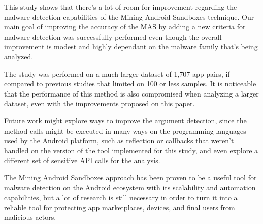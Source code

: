 This study shows that there's a lot of room for improvement regarding the malware detection capabilities of the Mining Android Sandboxes technique. Our main goal of improving the accuracy of the MAS by adding a new criteria for malware detection was successfully performed even though the overall improvement is modest and highly dependant on the malware family that's being analyzed.

The study was performed on a much larger dataset of 1,707 app pairs, if compared to previous studies that limited on 100 or less samples. It is noticeable that the performance of this method is also compromised when analyzing a larger dataset, even with the improvements proposed on this paper.

Future work might explore ways to improve the argument detection, since the method calls might be executed in many ways on the programming languages used by the Android platform, such as reflection or callbacks that weren't handled on the version of the tool implemented for this study, and even explore a different set of sensitive API calls for the analysis.

The Mining Android Sandboxes approach has been proven to be a useful tool for malware detection on the Android ecosystem with its scalability and automation capabilities, but a lot of research is still necessary in order to turn it into a reliable tool for protecting app marketplaces, devices, and final users from malicious actors.